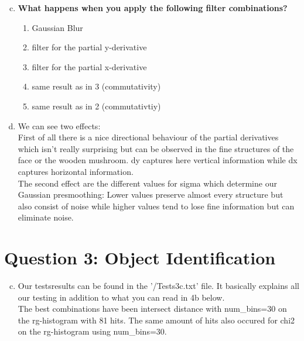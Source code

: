\documentclass[12pt]{article}
\begin{document}
\begin{enumerate}[a)]
    \setcounter{enumi}{2}
    \item 
        \textbf{What happens when you apply the following filter combinations?}\\
        \begin{enumerate}[1.]
            \item 
                Gaussian Blur
            \item
                filter for the partial y-derivative
            \item
                filter for the partial x-derivative
            \item
                same result as in 3 (commutativity)
            \item 
                same result as in 2 (commutativtiy)
        \end{enumerate}

    \item
        We can see two effects:\\
        First of all there is a nice directional behaviour of the partial derivatives which isn't really surprising but can be observed in the fine structures of the face or the wooden mushroom. dy captures here vertical information while dx captures horizontal information.\\
        The second effect are the different values for sigma which determine our Gaussian presmoothing: Lower values preserve almost every structure but also consist of noise while higher values tend to lose fine information but can eliminate noise.
\end{enumerate}


\section*{Question 3: Object Identification}

\begin{enumerate}[a)]
    \setcounter{enumi}{2}
    \item 
        Our testsresults can be found in the '/Tests3c.txt' file. It basically explains all our testing in addition to what you can read in 4b below.\\
        The best combinations have been intersect distance with num\_bins=30 on the rg-histogram with 81 hits. The same amount of hits also occured for chi2 on the rg-histogram using num\_bins=30.
\end{enumerate}
\end{document}
